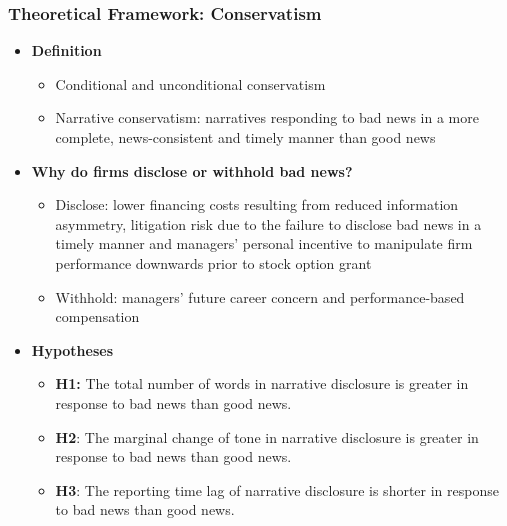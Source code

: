 \documentclass{beamer}
\begin{document}
\begin{frame}
\frametitle{Theoretical Framework: Conservatism}
\begin{itemize}
		
\item \textbf{Definition}

	\begin{itemize}
		\item Conditional and unconditional conservatism
		\item Narrative conservatism: narratives responding to bad news in a more complete, news-consistent and timely manner than good news
	\end{itemize}

\item \textbf{Why do firms disclose or withhold bad news?}

\begin{itemize}
	\item Disclose: lower financing costs resulting from reduced information asymmetry, litigation risk due to the failure to disclose bad news in a timely manner and managers' personal incentive to manipulate firm performance downwards prior to stock option grant
	\item Withhold: managers' future career concern and performance-based compensation
\end{itemize}

\item \textbf{Hypotheses}

\begin{itemize}
	\item  \textbf{H1:} The total number of words in narrative disclosure is greater in response to bad news than good news.
	\item  \textbf{H2}: The marginal change of tone in narrative disclosure is greater in response to bad news than good news.
	\item  \textbf{H3}: The reporting time lag of narrative disclosure is shorter in response to bad news than good news.
\end{itemize}

\end{itemize}
\end{frame}
\end{document}
